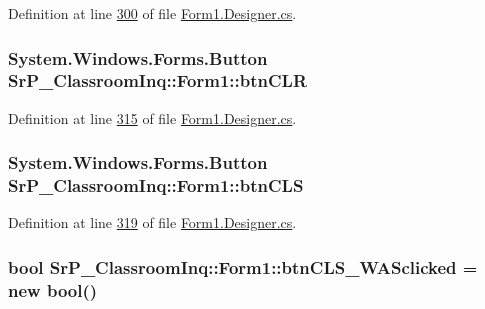 \-Definition at line \hyperlink{_form1_8_designer_8cs_source_l00300}{300} of file \hyperlink{_form1_8_designer_8cs_source}{\-Form1.\-Designer.\-cs}.

\hypertarget{class_sr_p___classroom_inq_1_1_form1_a43f801ebb9c0a215764953588fa9c4f1}{
\subsubsection[{btn\-C\-L\-R}]{\setlength{\rightskip}{0pt plus 5cm}\-System.\-Windows.\-Forms.\-Button {\bf \-Sr\-P\-\_\-\-Classroom\-Inq\-::\-Form1\-::btn\-C\-L\-R}}}
\label{class_sr_p___classroom_inq_1_1_form1_a43f801ebb9c0a215764953588fa9c4f1}


\-Definition at line \hyperlink{_form1_8_designer_8cs_source_l00315}{315} of file \hyperlink{_form1_8_designer_8cs_source}{\-Form1.\-Designer.\-cs}.

\hypertarget{class_sr_p___classroom_inq_1_1_form1_a500406f80ad03c1b3fdf9d7cfc75c7f3}{
\subsubsection[{btn\-C\-L\-S}]{\setlength{\rightskip}{0pt plus 5cm}\-System.\-Windows.\-Forms.\-Button {\bf \-Sr\-P\-\_\-\-Classroom\-Inq\-::\-Form1\-::btn\-C\-L\-S}}}
\label{class_sr_p___classroom_inq_1_1_form1_a500406f80ad03c1b3fdf9d7cfc75c7f3}


\-Definition at line \hyperlink{_form1_8_designer_8cs_source_l00319}{319} of file \hyperlink{_form1_8_designer_8cs_source}{\-Form1.\-Designer.\-cs}.

\hypertarget{class_sr_p___classroom_inq_1_1_form1_a262b78a24b801b386d3a5684a3145406}{
\subsubsection[{btn\-C\-L\-S\-\_\-\-W\-A\-Sclicked}]{\setlength{\rightskip}{0pt plus 5cm}bool {\bf \-Sr\-P\-\_\-\-Classroom\-Inq\-::\-Form1\-::btn\-C\-L\-S\-\_\-\-W\-A\-Sclicked} = new bool()}}
\label{class_sr_p___classroom_inq_1_1_form1_a262b78a24b801b386d3a5684a3145406}


